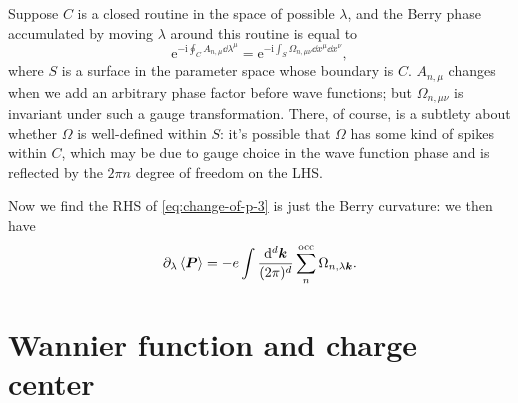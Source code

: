 \documentclass[hyperref, a4paper]{article}
\newcommand*{\ii}{\mathrm{i}}
\newcommand*{\ee}{\mathrm{e}}
\begin{document}
Suppose $C$ is a closed routine in the space of possible $\lambda$, 
and the Berry phase accumulated 
by moving $\lambda$ around this routine is equal to 
\begin{equation}
    \ee^{- \ii \oint_C A_{n, \mu} \dd{\lambda^\mu}}
    = \ee^{- \ii \int_S \Omega_{n, \mu \nu} \dd{x^\mu} \dd{x^\nu}},
\end{equation}
where $S$ is a surface in the parameter space whose boundary is $C$.
$A_{n, \mu}$ changes when we add an arbitrary phase factor before wave functions; 
but $\Omega_{n, \mu \nu}$ is invariant under such a gauge transformation.
There, of course, is a subtlety about whether $\Omega$ is well-defined within $S$:
it's possible that $\Omega$ has some kind of spikes within $C$,
which may be due to gauge choice in the wave function phase 
and is reflected by the $2\pi n$ degree of freedom on the LHS.

Now we find the RHS of \eqref{eq:change-of-p-3} is just the Berry curvature:
we then have 
\begin{equation}
    \partial_\lambda \expval{\vb*{P}}
    = - e \int \frac{\dd[d]{\vb*{k}}}{(2\pi)^d} \sum_{n}^{\text{occ}} \Omega_{n, \lambda \vb*{k}}.
\end{equation}

\section{Wannier function and charge center}
\end{document}

